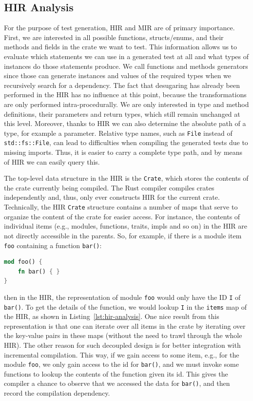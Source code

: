 \documentclass{article}
\begin{document}
\subsection{HIR Analysis}
For the purpose of test generation, \ac{HIR} and \ac{MIR} are of primary importance. First, we are interested in all possible functions, structs/enums, and their methods and fields in the crate we want to test. This information allows us to evaluate which statements we can use in a generated test at all and what types of instances do those statements produce. We call functions and methods generators since those can generate instances and values of the required types when we recursively search for a dependency. The fact that desugaring has already been performed in the \ac{HIR} has no influence at this point, because the transformations are only performed intra-procedurally. We are only interested in type and method definitions, their parameters and return types, which still remain unchanged at this level. Moreover, thanks to \ac{HIR} we can also determine the absolute path of a type, for example a parameter. Relative type names, such as \lstinline{File} instead of \lstinline{std::fs::File}, can lead to difficulties when compiling the generated tests due to missing imports. Thus, it is easier to carry a complete type path, and by means of \ac{HIR} we can easily query this. 

The top-level data structure in the \ac{HIR} is the \lstinline{Crate}, which stores the contents of the crate currently being compiled. The Rust compiler compiles crates independently and, thus, only ever constructs \ac{HIR} for the current crate. Technically, the \ac{HIR} \lstinline{Crate} structure contains a number of maps that serve to organize the content of the crate for easier access. For instance, the contents of individual items (e.g., modules, functions, traits, impls and so on) in the \ac{HIR} are not directly accessible in the parents. So, for example, if there is a module item \lstinline{foo} containing a function \lstinline{bar()}:

\begin{lstlisting}[language=Rust, style=boxed, caption={}]
mod foo() {
    fn bar() { }
}
\end{lstlisting}
then in the \ac{HIR}, the representation of module \lstinline{foo} would only have the ID \lstinline{I} of \lstinline{bar()}. To get the details of the function, we would lookup \lstinline{I} in the \lstinline{items} map of the \ac{HIR}, as shown in Listing~\ref{lst:hir-analysis}. One nice result from this representation is that one can iterate over all items in the crate by iterating over the key-value pairs in these maps (without the need to trawl through the whole \ac{HIR}). The other reason for such decoupled design is for better integration with incremental compilation. This way, if we gain access to some item, e.g., for the module \lstinline{foo}, we only gain access to the id for \lstinline{bar()}, and we must invoke some functions to lookup the contents of the function given its id. This gives the compiler a chance to observe that we accessed the data for \lstinline{bar()}, and then record the compilation dependency. 
\end{document}
